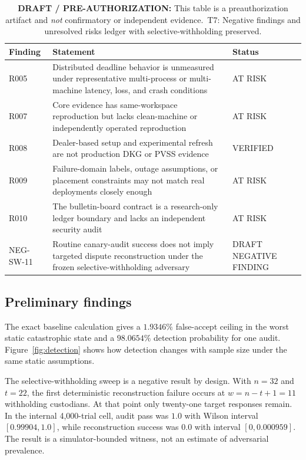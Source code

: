 \documentclass[10pt]{article}
\newcommand{\KeystoneDraftTableNotice}{\textbf{DRAFT / PRE-AUTHORIZATION:} This table is a preauthorization artifact and \textit{not} confirmatory or independent evidence.}
\begin{document}
\begin{table}[h]
\centering
\caption[\texorpdfstring{T7: Negative findings and unresolved risks}{T7: Negative findings and unresolved risks}]{\KeystoneDraftTableNotice\ \newline T7: Negative findings and unresolved risks ledger with selective-withholding preserved.}
\label{tab:t7}
\small
\begin{tabularx}{\textwidth}{@{}lXl@{}}
\toprule
Finding & Statement & Status \\
\midrule
\rowcolor{statusgray}
R005 & Distributed deadline behavior is unmeasured under representative multi-process or multi-machine latency, loss, and crash conditions & AT RISK \\
R007 & Core evidence has same-workspace reproduction but lacks clean-machine or independently operated reproduction & AT RISK \\
R008 & Dealer-based setup and experimental refresh are not production DKG or PVSS evidence & VERIFIED \\
R009 & Failure-domain labels, outage assumptions, or placement constraints may not match real deployments closely enough & AT RISK \\
R010 & The bulletin-board contract is a research-only ledger boundary and lacks an independent security audit & AT RISK \\
NEG-SW-11 & Routine canary-audit success does not imply targeted dispute reconstruction under the frozen selective-withholding adversary & DRAFT NEGATIVE FINDING \\
\bottomrule
\end{tabularx}
\end{table}

\subsection{Preliminary findings}

The exact baseline calculation gives a $1.9346\%$ false-accept ceiling in the worst static catastrophic state and a $98.0654\%$ detection probability for one audit. Figure~\ref{fig:detection} shows how detection changes with sample size under the same static assumptions.

The selective-withholding sweep is a negative result by design. With $n=32$ and $t=22$, the first deterministic reconstruction failure occurs at $w=n-t+1=11$ withholding custodians. At that point only twenty-one target responses remain. In the internal 4,000-trial cell, audit pass was $1.0$ with Wilson interval $[0.99904,1.0]$, while reconstruction success was $0.0$ with interval $[0,0.000959]$. The result is a simulator-bounded witness, not an estimate of adversarial prevalence.
\end{document}
